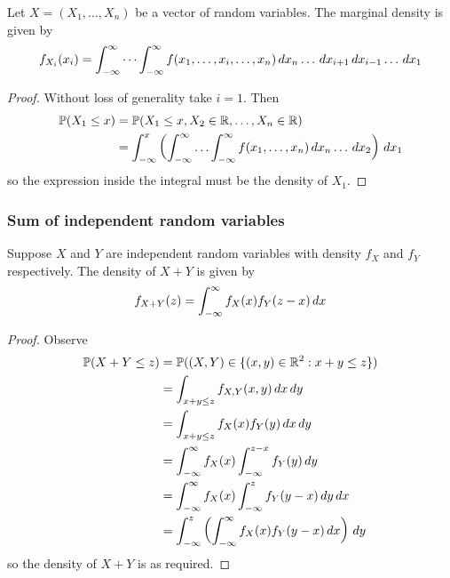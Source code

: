 \documentclass{../template/note}
\begin{document}
    \begin{proposition}
        Let \(X = (X_1, \dots, X_n)\) be a vector of random variables. The marginal density is given by
        \begin{align*}
            f_{X_i}(x_i) = \int_{-\infty}^\infty \cdots \int_{-\infty}^\infty f(x_1, \dots, x_i, \dots, x_n) \,d{x}_n \dots \,d{x}_{i+1} \,d{x}_{i-1} \dots \,d{x}_1
        \end{align*}
    \end{proposition}

    \begin{proof}
        Without loss of generality take \(i=1\). Then
        \begin{align*}
            \mathbb P(X_1 \leq x) &= \mathbb P(X_1 \leq x, X_2 \in \mathbb R, \dots, X_n \in \mathbb R) \\
            &= \int_{-\infty}^x \left(\int_{-\infty}^\infty \dots \int_{-\infty}^\infty f(x_1, \dots, x_n) \,d{x}_n \dots \,d{x}_2 \right)\,d{x}_1
        \end{align*}
        so the expression inside the integral must be the density of \(X_1\).
    \end{proof}
    
    \subsubsection{Sum of independent random variables}


    \begin{proposition}
        Suppose \(X\) and \(Y\) are independent random variables with density \(f_X\) and \(f_Y\) respectively. The density of \(X+Y\) is given by
        \begin{align*}
            f_{X+Y}(z) = \int_{-\infty}^\infty f_X(x)f_Y(z-x) \,d{x}
        \end{align*}
    \end{proposition}
    
    \begin{proof}
        Observe
        \begin{align*}
            \mathbb P(X+Y \leq z) &= \mathbb P((X, Y) \in \{(x, y) \in \mathbb R^2: x+y \leq z\}) \\
            &= \int_{x+y \leq z} f_{X,Y}(x, y) \,d{x} \,d{y} \\
            &= \int_{x+y \leq z} f_X(x) f_Y(y) \,d{x} \,d{y} \\
            &= \int_{-\infty}^\infty f_X(x) \int_{-\infty}^{z-x} f_Y(y) \,d{y} \\
            &= \int_{-\infty}^\infty f_X(x) \int_{-\infty}^z f_Y(y-x) \,d{y} \,d{x} \\
            &= \int_{-\infty}^z \left(\int_{-\infty}^\infty f_X(x)f_Y(y-x) \,d{x}\right) \,d{y}
        \end{align*}
        so the density of \(X+Y\) is as required.
    \end{proof}
    
\end{document}
